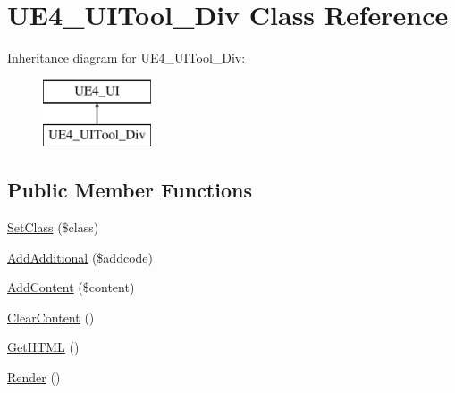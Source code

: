 \hypertarget{class_u_e4___u_i_tool___div}{\section{U\-E4\-\_\-\-U\-I\-Tool\-\_\-\-Div Class Reference}
\label{class_u_e4___u_i_tool___div}
}
Inheritance diagram for U\-E4\-\_\-\-U\-I\-Tool\-\_\-\-Div\-:\begin{figure}[H]
\begin{center}
\leavevmode
\includegraphics[height=2.000000cm]{class_u_e4___u_i_tool___div}
\end{center}
\end{figure}
\subsection*{Public Member Functions}
\begin{DoxyCompactItemize}
\item 
\hyperlink{class_u_e4___u_i_tool___div_a7b0a15bd0ea56f48fb406d105cbbedbe}{Set\-Class} (\$class)
\item 
\hyperlink{class_u_e4___u_i_tool___div_a76d0f08d397ae0379debcc9078bf2e47}{Add\-Additional} (\$addcode)
\item 
\hyperlink{class_u_e4___u_i_tool___div_a7fd6d1b0467b34de443953e2be12f13a}{Add\-Content} (\$content)
\item 
\hyperlink{class_u_e4___u_i_tool___div_a667e20adae1192d065e3335c9a2385da}{Clear\-Content} ()
\item 
\hyperlink{class_u_e4___u_i_tool___div_abc99f9ea27a455eed49d783d5e03c4ad}{Get\-H\-T\-M\-L} ()
\item 
\hyperlink{class_u_e4___u_i_tool___div_a1a6915de89093bc6383d7c1f18ab81e2}{Render} ()
\end{DoxyCompactItemize}


